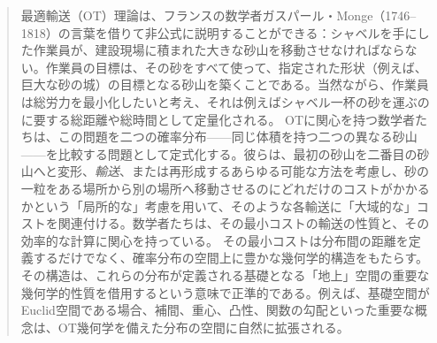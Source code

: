 
\begin{abstract}
最適輸送（OT）理論は、フランスの数学者ガスパール・Monge（1746--1818）の言葉を借りて非公式に説明することができる：シャベルを手にした作業員が、建設現場に積まれた大きな砂山を移動させなければならない。作業員の目標は、その砂をすべて使って、指定された形状（例えば、巨大な砂の城）の目標となる砂山を築くことである。当然ながら、作業員は総労力を最小化したいと考え、それは例えばシャベル一杯の砂を運ぶのに要する総距離や総時間として定量化される。
%
OTに関心を持つ数学者たちは、この問題を二つの確率分布——同じ体積を持つ二つの異なる砂山——を比較する問題として定式化する。彼らは、最初の砂山を二番目の砂山へと変形、\emph{輸送}、または再形成するあらゆる可能な方法を考慮し、砂の一粒をある場所から別の場所へ移動させるのにどれだけのコストがかかるかという「局所的な」考慮を用いて、そのような各輸送に「大域的な」コストを関連付ける。数学者たちは、その最小コストの輸送の性質と、その効率的な計算に関心を持っている。
%
その最小コストは分布間の距離を定義するだけでなく、確率分布の空間上に豊かな幾何学的構造をもたらす。その構造は、これらの分布が定義される基礎となる「地上」空間の重要な幾何学的性質を借用するという意味で正準的である。例えば、基礎空間がEuclid空間である場合、補間、重心、凸性、関数の勾配といった重要な概念は、OT幾何学を備えた分布の空間に自然に拡張される。




\end{abstract}
